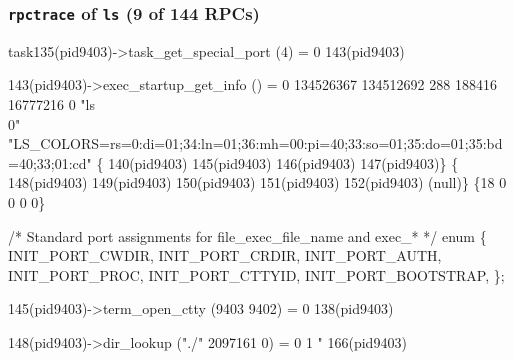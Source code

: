 \documentclass{beamer}
\begin{document}
\begin{frame}[fragile]
\frametitle{{\tt rpctrace} of {\tt ls} (9 of 144 RPCs)}
\begin{semiverbatim}
\tiny
task135(pid9403)->task_get_special_port (4) = 0    143(pid9403)

  143(pid9403)->exec_startup_get_info () = 0 134526367 134512692 288 188416 16777216 0 "ls\\0"
        "LS_COLORS=rs=0:di=01;34:ln=01;36:mh=00:pi=40;33:so=01;35:do=01;35:bd=40;33;01:cd"
        \{  140(pid9403)   145(pid9403)   146(pid9403)   147(pid9403)\}
        \{  148(pid9403)   149(pid9403)   150(pid9403)   151(pid9403)   152(pid9403) (null)\}
        \{18 0 0 0 0\}

/* Standard port assignments for file_exec_file_name and exec_* */
enum
  \{
    INIT_PORT_CWDIR,
    INIT_PORT_CRDIR,
    INIT_PORT_AUTH,
    INIT_PORT_PROC,
    INIT_PORT_CTTYID,
    INIT_PORT_BOOTSTRAP,
  \};

  145(pid9403)->term_open_ctty (9403 9402) = 0    138(pid9403)

  148(pid9403)->dir_lookup ("./" 2097161 0) = 0 1 "    166(pid9403)


\end{semiverbatim}
\end{frame}
\end{document}
